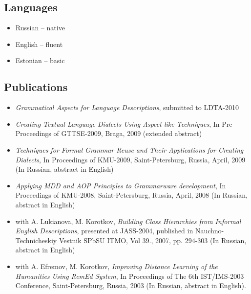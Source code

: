 \documentclass[a4paper, 12pt]{article}
\begin{document}
\subsection*{Languages}

\begin{itemize}
	\item Russian -- native
	\item English -- fluent
	\item Estonian -- basic
\end{itemize}

\subsection*{Publications}
\begin{itemize}
	\item {\it Grammatical Aspects for Language Descriptions}, submitted to LDTA-2010
	\item {\it Creating Textual Language Dialects Using Aspect-like Techniques}, In Pre-Proceedings of GTTSE-2009, Braga, 2009 (extended abstract)
	\item {\it Techniques for Formal Grammar Reuse and Their Applications for Creating Dialects}, In Proceedings of KMU-2009, Saint-Petersburg, Russia, April, 2009 (In Russian, abstract in English)
	\item {\it Applying MDD and AOP Principles to Grammarware development}, In Proceedings of KMU-2008, Saint-Petersburg, Russia, April, 2008 (In Russian, abstract in English)
	\item with A. Lukianova, M. Korotkov, {\it Building Class Hierarchies from Informal English Descriptions}, presented at JASS-2004, published in Nauchno-Technicheskiy Vestnik SPbSU ITMO, Vol 39., 2007, pp. 294-303 (In Russian, abstract in English)
	\item with A. Efremov, M. Korotkov, {\it Improving Distance Learning of the Humanities Using {\it RemEd} System}, In Proceedings of The 6th IST/IMS-2003 Conference, Saint-Petersburg, Russia, 2003 (In Russian, abstract in English).
\end{itemize}
\end{document}
